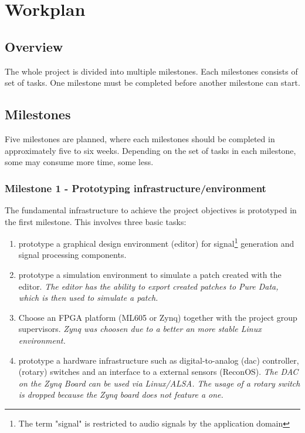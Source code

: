 
\chapter{Workplan}
\label{chapter:Workplan}

\section{Overview}


The whole project is divided into multiple milestones. Each milestones consists of set of tasks. One milestone must be completed before another milestone can start.

\section{Milestones}

Five milestones are planned, where each milestones should be completed in approximately five to six weeks. Depending on the set of tasks in each milestone, some may consume more time, some less.

\subsection{Milestone 1 - Prototyping infrastructure/environment}

The fundamental infrastructure to achieve the project objectives is prototyped in the first milestone. This involves three basic tasks:

\begin{enumerate}
	\item prototype a graphical design environment (editor) for signal\footnote{The term "signal" is restricted to audio signals by the application domain} generation and signal processing components. 
	\item prototype a simulation environment to simulate a patch created with the editor.
	      \textit{The editor has the ability to export created patches to Pure Data, which is then used to simulate a patch.}
	\item Choose an \ac{FPGA} platform (ML605 or Zynq) together with the project group supervisors.
	      \textit{Zynq was choosen due to a better an more stable Linux environment.}
	\item prototype a hardware infrastructure such as digital-to-analog (dac) controller, (rotary) switches and an interface to a external sensors (ReconOS).
	      \textit{The DAC on the Zynq Board can be used via Linux/ALSA. The usage of a rotary switch is dropped because the Zynq board does not feature a one.}
\end{enumerate}

